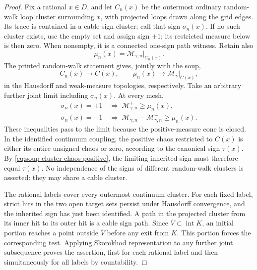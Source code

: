 \begin{proof}
Fix a rational \(x\in D\), and let \(C_n(x)\) be the outermost
ordinary random-walk loop cluster surrounding \(x\), with projected
loops drawn along the grid edges.  Its trace is contained in a cable
sign cluster; call that sign \(\sigma_n(x)\).  If no such cluster
exists, use the empty set and assign sign \(+1\); its restricted
measure below is then zero.  When nonempty, it is a connected
one-sign path witness.  Retain also
\[
           \mu_n(x)=\mathcal M_{\gamma,n}|_{C_n(x)}.
\]
The printed random-walk statement
\cite[Theorem~8.3]{JLQ2023Fields} gives, jointly with the soup,
\[
        C_n(x)\longrightarrow C(x),\qquad
        \mu_n(x)\longrightarrow\mathcal M_\gamma|_{C(x)},
\]
in the Hausdorff and weak-measure topologies, respectively.
Take an arbitrary further joint limit including \(\sigma_n(x)\).
At every mesh,
\[
 \begin{split}
  \sigma_n(x)=+1&\ \Longrightarrow\
       \mathcal M_{\gamma,n}^{+}\ge\mu_n(x),\\
  \sigma_n(x)=-1&\ \Longrightarrow\
       \mathcal M_{\gamma,n}-\mathcal M_{\gamma,n}^{+}\ge\mu_n(x).
 \end{split}
\]
These inequalities pass to the limit because the positive-measure cone
is closed.  In the identified continuum coupling, the positive chaos
restricted to \(C(x)\) is either its entire unsigned chaos or zero,
according to the canonical sign \(\tau(x)\).  By
\eqref{eq:soup-cluster-chaos-positive}, the limiting inherited sign
must therefore equal \(\tau(x)\).  No independence of the signs of
different random-walk clusters is asserted: they may share a cable
cluster.

The rational labels cover every outermost continuum cluster.
For each fixed label, strict hits in the two open target sets persist
under Hausdorff convergence, and the inherited sign has just been
identified.  A path in the projected cluster from its inner hit to
its outer hit is a cable sign path.  Since
\(\overline V\subset\operatorname{int}K\), an initial portion
reaches a point outside \(\overline V\) before any exit from \(K\).
This portion forces the corresponding test.  Applying Skorokhod
representation to any further joint
subsequence proves the assertion, first for each rational label and
then simultaneously for all labels by countability.
\end{proof}

